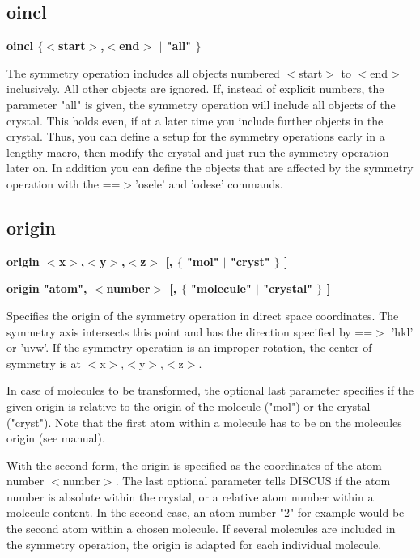\subsection*{oincl}
{\bf oincl $ \{$$ <$start$> $,$ <$end$> $ $| $ "all" $\} $ \par }
\par
\vspace{3pt}
The symmetry operation includes all objects numbered $ <$start$> $ to $ <$end$> $ 
inclusively. All other objects are ignored. 
If, instead of explicit numbers, the parameter "all" is given, the 
symmetry operation will include all objects of the crystal. This holds 
even, if at a later time you include further objects in the crystal. 
Thus, you can define a setup for the symmetry operations early in a 
lengthy macro, then modify the crystal and just run the symmetry 
operation later on. 
In addition you can define the objects that are affected by the 
symmetry operation with the ==$> $'osele' and 'odese' commands. 
\subsection*{origin}
{\bf origin $ <$x$> $,$ <$y$> $,$ <$z$> $ [, $ \{$ "mol" $| $ "cryst" $\} $ ] \par }
{\bf origin "atom", $ <$number$> $ [, $ \{$ "molecule" $| $ "crystal" $\} $ ] \par }
\par
\vspace{3pt}
Specifies the origin of the symmetry operation in direct space coordinates. 
The symmetry axis intersects this point and has the direction specified 
by ==$> $ 'hkl' or 'uvw'. If the symmetry operation is an improper rotation, 
the center of symmetry is at $ <$x$> $,$ <$y$> $,$ <$z$> $. 
\par
In case of molecules to be transformed, the optional last parameter 
specifies if the given origin is relative to the origin of the 
molecule ("mol") or the crystal ("cryst"). Note that the first 
atom within a molecule has to be on the molecules origin (see manual). 
\par
With the second form, the origin is specified as the coordinates of 
the atom number $ <$number$> $. 
The last optional parameter tells DISCUS if the atom number is 
absolute within the crystal, or a relative atom number within a 
molecule content. 
In the second case, an atom number "2" for example would be the second 
atom within a chosen molecule. If several molecules are included in the 
symmetry operation, the origin is adapted for each individual molecule. 
\par
